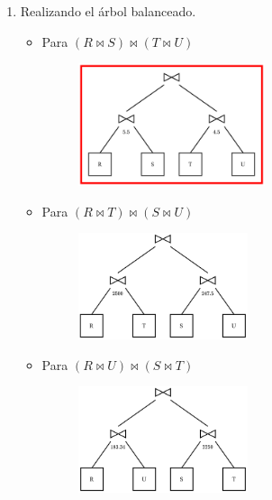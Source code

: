 \documentclass{templateNote}
\begin{document}
\begin{enumerate}
\begin{enumerate}[label=\arabic*)]
        \item Realizando el árbol balanceado.
        \begin{itemize}
            \item Para $(R \Join S) \Join (T \Join U)$
            \begin{figure}[H]
                \centering
                \includegraphics[width=0.55\textwidth]{img/E4-AB1.png}
            \end{figure}

            \item Para $(R \Join T) \Join (S \Join U)$
            \begin{figure}[H]
                \centering
                \includegraphics[width=0.5\textwidth]{img/E4-AB2.png}
            \end{figure}

            \newpage
            \item Para $(R \Join U) \Join (S \Join T)$
            \begin{figure}[H]
                \centering
                \includegraphics[width=0.5\textwidth]{img/E4-AB3.png}
            \end{figure}
        \end{itemize}
        

\end{enumerate}
\end{enumerate}
\end{document}
